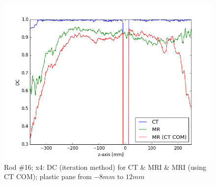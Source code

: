 \begin{figure}[!tbh]
    \centering
    \includegraphics[scale=0.6]{../fig/python/ph3_v2/dice/ph3_MR_v2_x4_DC_iter.png}
    \caption{Rod \#16; x4: DC (iteration method) for CT \& MRI \& MRI (using CT COM); plastic pane from $-8mm$ to $12mm$}
    \label{fig:ph3_DC_x4}
\end{figure}